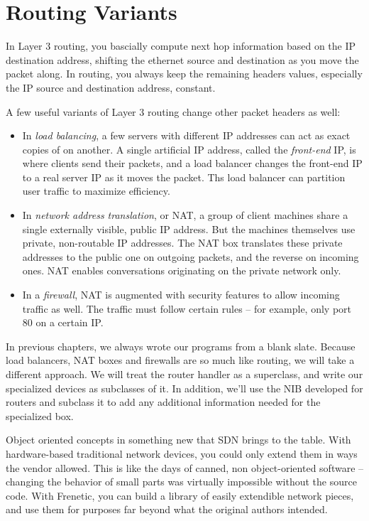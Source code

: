 \chapter{Routing Variants}

In Layer 3 routing, you bascially compute next hop information based on the IP destination address,
shifting the ethernet source and destination as you move the packet along.  In routing, you 
always keep the remaining headers values, especially the IP source and destination address, 
constant. 

A few useful variants of Layer 3 routing change other packet headers as well:

\begin{itemize}
\item In \emph{load balancing}, a few servers with different IP addresses can act as exact copies
of on another.  A single artificial IP address, called the \emph{front-end} IP, is where clients send their
packets, and a load balancer changes the front-end IP to a real server IP as it moves the packet.
Ths load balancer can partition user traffic to maximize efficiency.
\item In \emph{network address translation}, or NAT, a group of client machines share a single
externally visible, public IP address.  But the machines themselves use private, non-routable
IP addresses.  The NAT box translates these private addresses to the public one on outgoing packets,
and the reverse on incoming ones.   NAT enables conversations originating on the private
network only.  
\item In a \emph{firewall}, NAT is augmented with security features to allow incoming traffic
as well.  The traffic must follow certain rules -- for example, only port 80 on a certain IP.  
\end{itemize}

In previous chapters, we always wrote our programs from a blank slate.  Because load balancers, 
NAT boxes and firewalls are so much like routing, we will take a different approach.  We will
treat the router handler as a superclass, and write our specialized devices as subclasses of it.
In addition, we'll use the NIB developed for routers and subclass it to add any additional 
information needed for the specialized box.  

Object oriented concepts in something new that SDN brings to the table.  With hardware-based
traditional network devices, you could only extend them in ways the vendor allowed.  This is 
like the days of canned, non object-oriented software -- changing the behavior of small 
parts was virtually impossible without the source code.  With Frenetic, you can build a library
of easily extendible network pieces, and use them for purposes far beyond what the original
authors intended. 

